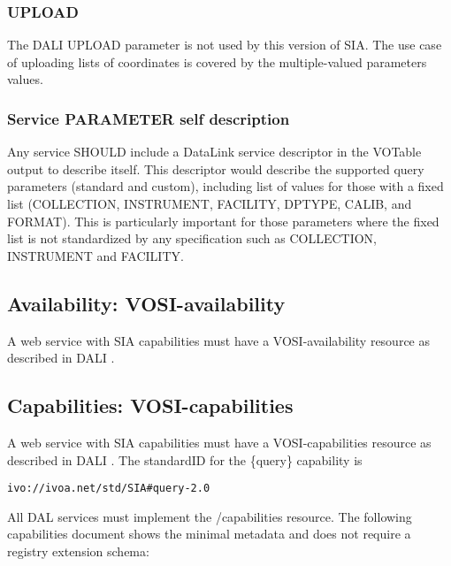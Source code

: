 \documentclass[11pt,a4paper]{ivoa}
\begin{document}
\subsubsection{UPLOAD}
 The DALI UPLOAD parameter is not used by this version of SIA. The use case of uploading lists of coordinates is covered by the multiple-valued parameters values.

\subsubsection{Service PARAMETER self description}
\label{sec:selfdesc}
Any service SHOULD  include a DataLink service descriptor in the VOTable output to describe itself.
This descriptor would describe the supported query parameters (standard and custom), including list
of values for those with a fixed list (COLLECTION, INSTRUMENT, FACILITY, DPTYPE, CALIB, and FORMAT).
This is particularly important for those parameters where the fixed list is not standardized by any
specification such as COLLECTION, INSTRUMENT and FACILITY.

\subsection{Availability: VOSI-availability}
A web service with SIA capabilities must have a VOSI-availability resource \citep{2017ivoa.spec.0524G}  as described in DALI .
\subsection{Capabilities: VOSI-capabilities}
A web service with SIA capabilities must have a VOSI-capabilities resource \citep{2017ivoa.spec.0524G} as described in DALI . The standardID for the \{query\} capability is

\begin{lstlisting}
ivo://ivoa.net/std/SIA#query-2.0
\end{lstlisting}

All DAL services must implement the /capabilities resource. The following capabilities document shows the minimal metadata and does not require a registry extension schema:
\end{document}
